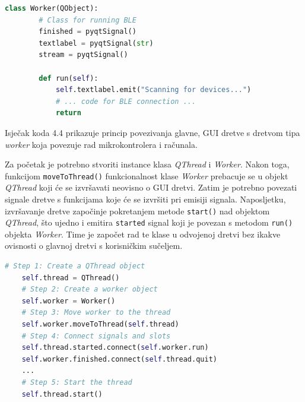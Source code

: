 \begin{lstlisting}[caption={Klasa \textit{Worker}}, language=Python]
	class Worker(QObject):
		# Class for running BLE 
		finished = pyqtSignal()
		textlabel = pyqtSignal(str)
		stream = pyqtSignal()
	
		def run(self):
			self.textlabel.emit("Scanning for devices...")
			# ... code for BLE connection ... 
			return
\end{lstlisting}

Isječak koda 4.4 prikazuje princip povezivanja glavne, GUI dretve s dretvom tipa \textit{worker} koja povezuje rad mikrokontrolera i računala.

Za početak je potrebno stvoriti instance klasa \textit{QThread} i \textit{Worker}. Nakon toga, funkcijom \lstinline|moveToThread()| funkcionalnost klase \textit{Worker} prebacuje se u objekt \textit{QThread} koji će se izvršavati neovisno o GUI dretvi. Zatim je potrebno povezati signale dretve s funkcijama koje će se izvršiti pri emisiji signala. Naposljetku, izvršavanje dretve započinje pokretanjem metode \lstinline|start()| nad objektom \textit{QThread}, što ujedno i emitira \lstinline|started| signal koji je povezan s metodom \lstinline|run()| objekta \textit{Worker}. Time je započet rad te klase u odvojenoj dretvi bez ikakve ovisnosti o glavnoj dretvi s korisničkim sučeljem.

\begin{lstlisting}[caption={Povezivanje glavne dretve s dretvom tipa \textit{worker}}, language=Python]
	# Step 1: Create a QThread object
	self.thread = QThread()
	# Step 2: Create a worker object
	self.worker = Worker()
	# Step 3: Move worker to the thread
	self.worker.moveToThread(self.thread)
	# Step 4: Connect signals and slots
	self.thread.started.connect(self.worker.run)
	self.worker.finished.connect(self.thread.quit)
	...
	# Step 5: Start the thread
	self.thread.start()
\end{lstlisting}


\eject